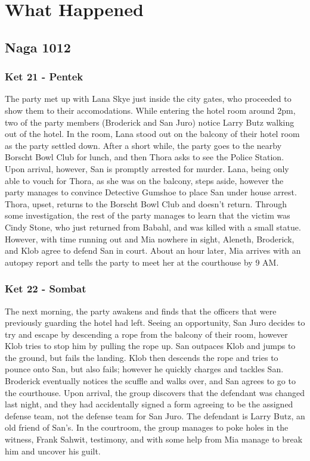 \section{What Happened}

\subsection{Naga 1012}
\subsubsection{Ket 21 - Pentek}

The party met up with Lana Skye just inside the city gates, who proceeded to show them to their accomodations. While entering the hotel room around 2pm, two of the party members (Broderick and San Juro) notice Larry Butz walking out of the hotel. In the room, Lana stood out on the balcony of their hotel room as the party settled down. After a short while, the party goes to the nearby Borscht Bowl Club for lunch, and then Thora asks to see the Police Station. Upon arrival, however, San is promptly arrested for murder. Lana, being only able to vouch for Thora, as she was on the balcony, steps aside, however the party manages to convince Detective Gumshoe to place San under house arrest. Thora, upset, returns to the Borscht Bowl Club and doesn't return. Through some investigation, the rest of the party manages to learn that the victim was Cindy Stone, who just returned from Babahl, and was killed with a small statue. However, with time running out and Mia nowhere in sight, Aleneth, Broderick, and Klob agree to defend San in court. About an hour later, Mia arrives with an autopsy report and tells the party to meet her at the courthouse by 9 AM. 

\subsubsection{Ket 22 - Sombat}
The next morning, the party awakens and finds that the officers that were previously guarding the hotel had left. Seeing an opportunity, San Juro decides to try and escape by descending a rope from the balcony of their room, however Klob tries to stop him by pulling the rope up. San outpaces Klob and jumps to the ground, but fails the landing. Klob then descends the rope and tries to pounce onto San, but also fails; however he quickly charges and tackles San. Broderick eventually notices the scuffle and walks over, and San agrees to go to the courthouse. Upon arrival, the group discovers that the defendant was changed last night, and they had accidentally signed a form agreeing to be the assigned defense team, not the defense team for San Juro. The defendant is Larry Butz, an old friend of San's. In the courtroom, the group manages to poke holes in the witness, Frank Sahwit, testimony, and with some help from Mia manage to break him and uncover his guilt.

